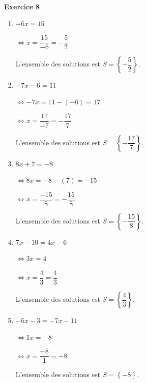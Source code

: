 \documentclass[12pt,a4paper,french]{article}
\begin{document}
\noindent\textbf{Exercice 8}\par
\smallskip
\begin{enumerate}
\item $-6x = 15$

$\Leftrightarrow x = \dfrac{15}{-6} = - \dfrac{5}{2}$

L'ensemble des solutions est $S = \left\{- \dfrac{5}{2}\right\}$.

\item $-7x - 6 = 11$

$\Leftrightarrow -7x = 11 - (-6) = 17$

$\Leftrightarrow x = \dfrac{17}{-7} = - \dfrac{17}{7}$

L'ensemble des solutions est $S = \left\{- \dfrac{17}{7}\right\}$.

\item $8x + 7 = -8$

$\Leftrightarrow 8x = -8 - (7) = -15$

$\Leftrightarrow x = \dfrac{-15}{8} = - \dfrac{15}{8}$

L'ensemble des solutions est $S = \left\{- \dfrac{15}{8}\right\}$.

\item $7x - 10 = 4x - 6$

$\Leftrightarrow 3x = 4$

$\Leftrightarrow x = \dfrac{4}{3} = \dfrac{4}{3}$

L'ensemble des solutions est $S = \left\{\dfrac{4}{3}\right\}$.

\item $-6x - 3 = -7x - 11$

$\Leftrightarrow 1x = -8$

$\Leftrightarrow x = \dfrac{-8}{1} = -8$

L'ensemble des solutions est $S = \left\{-8\right\}$.

\end{enumerate}
\medskip
\end{document}
